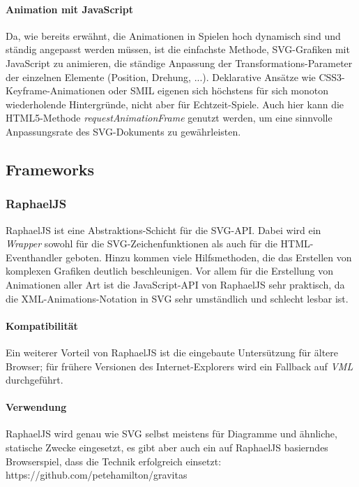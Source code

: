 \documentclass[a4paper, 12pt]{article}
\begin{document}
\paragraph{Animation mit JavaScript} Da, wie bereits erwähnt, die Animationen in Spielen hoch dynamisch sind und ständig angepasst werden müssen, ist die einfachste Methode, SVG-Grafiken mit JavaScript zu animieren, die ständige Anpassung der Transformations-Parameter der einzelnen Elemente (Position, Drehung, ...). Deklarative Ansätze wie CSS3-Keyframe-Animationen oder SMIL eigenen sich höchstens für sich monoton wiederholende Hintergründe, nicht aber für Echtzeit-Spiele. Auch hier kann die HTML5-Methode \emph{requestAnimationFrame} genutzt werden, um eine sinnvolle Anpassungsrate des SVG-Dokuments zu gewährleisten.
\subsection{Frameworks}
\subsubsection{RaphaelJS}
RaphaelJS ist eine Abstraktions-Schicht für die SVG-API. Dabei wird ein \emph{Wrapper} sowohl für die SVG-Zeichenfunktionen als auch für die HTML-Eventhandler geboten. Hinzu kommen viele Hilfsmethoden, die das Erstellen von komplexen Grafiken deutlich beschleunigen. Vor allem für die Erstellung von Animationen aller Art ist die JavaScript-API von RaphaelJS sehr praktisch, da die XML-Animations-Notation in SVG sehr umständlich und schlecht lesbar ist.
\paragraph{Kompatibilität} Ein weiterer Vorteil von RaphaelJS ist die eingebaute Untersützung für ältere Browser; für frühere Versionen des Internet-Explorers wird ein Fallback auf \emph{VML} durchgeführt.
\paragraph{Verwendung} RaphaelJS wird genau wie SVG selbst meistens für Diagramme und ähnliche, statische Zwecke eingesetzt, es gibt aber auch ein auf RaphaelJS basierndes Browserspiel, dass die Technik erfolgreich einsetzt: https://github.com/petehamilton/gravitas
\end{document}
